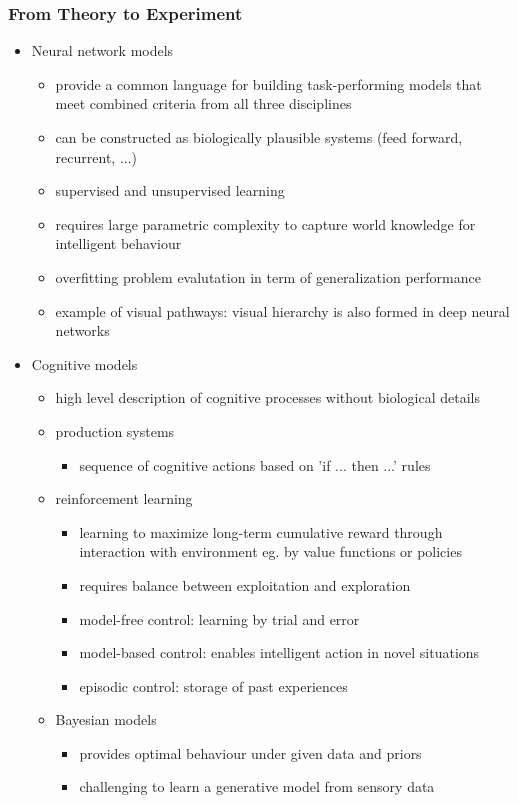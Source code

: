 \documentclass[
t, %
10pt, %
aspectratio=1610, %
ngerman,
english,
]{beamer}
\begin{document}
\begin{frame}
    \frametitle{From Theory to Experiment}
    \begin{itemize}
     \item Neural network models
     \begin{itemize}
      \item provide a common language for building task-performing models that meet combined criteria from all three disciplines
      \item can be constructed as biologically plausible systems (feed forward, recurrent, ...)
      \item supervised and unsupervised learning
      \item requires large parametric complexity to capture world knowledge for intelligent behaviour
      \item overfitting problem \textrightarrow evalutation in term of generalization performance
      \item example of visual pathways: visual hierarchy is also formed in deep neural networks
     \end{itemize}
     \item Cognitive models
     \begin{itemize}
      \item high level description of cognitive processes without biological details
      \item production systems
      \begin{itemize}
       \item sequence of cognitive actions based on 'if ... then ...' rules
      \end{itemize}
     \item reinforcement learning
     \begin{itemize}
      \item learning to maximize long-term cumulative reward through interaction with environment eg. by value functions or policies
      \item requires balance between exploitation and exploration
      \item model-free control: learning by trial and error
      \item model-based control: enables intelligent action in novel situations
      \item episodic control: storage of past experiences
     \end{itemize}
     \item Bayesian models
     \begin{itemize}
      \item provides optimal behaviour under given data and priors
      \item challenging to learn a generative model from sensory data
     \end{itemize}
     \end{itemize}
    \end{itemize}
\end{frame}
\end{document}
